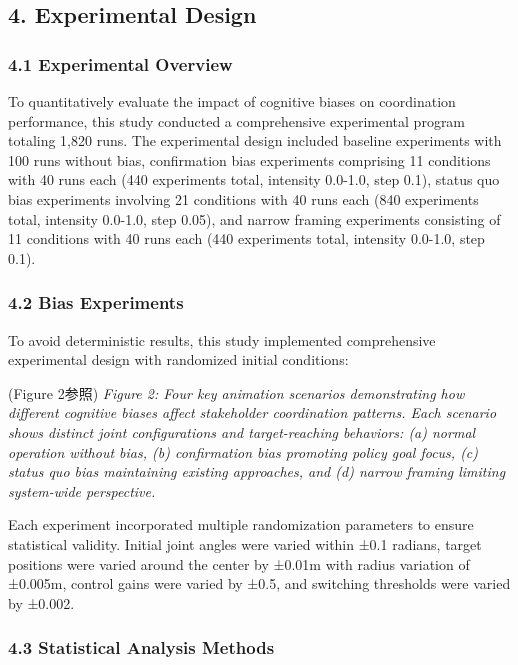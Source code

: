 \subsection{4. Experimental Design}\label{experimental-design}

\subsubsection{4.1 Experimental Overview}\label{experimental-overview}

To quantitatively evaluate the impact of cognitive biases on coordination performance, this study conducted a comprehensive experimental program totaling 1,820 runs. The experimental design included baseline experiments with 100 runs without bias, confirmation bias experiments comprising 11 conditions with 40 runs each (440 experiments total, intensity 0.0-1.0, step 0.1), status quo bias experiments involving 21 conditions with 40 runs each (840 experiments total, intensity 0.0-1.0, step 0.05), and narrow framing experiments consisting of 11 conditions with 40 runs each (440 experiments total, intensity 0.0-1.0, step 0.1).

\subsubsection{4.2 Bias Experiments}\label{bias-experiments}

To avoid deterministic results, this study implemented comprehensive experimental design with randomized initial conditions:

(Figure 2参照) \emph{Figure 2: Four key animation scenarios demonstrating how different cognitive biases affect stakeholder coordination patterns. Each scenario shows distinct joint configurations and target-reaching behaviors: (a) normal operation without bias, (b) confirmation bias promoting policy goal focus, (c) status quo bias maintaining existing approaches, and (d) narrow framing limiting system-wide perspective.}

Each experiment incorporated multiple randomization parameters to ensure statistical validity. Initial joint angles were varied within ±0.1 radians, target positions were varied around the center by ±0.01m with radius variation of ±0.005m, control gains were varied by ±0.5, and switching thresholds were varied by ±0.002.

\subsubsection{4.3 Statistical Analysis Methods}\label{statistical-analysis-methods}

